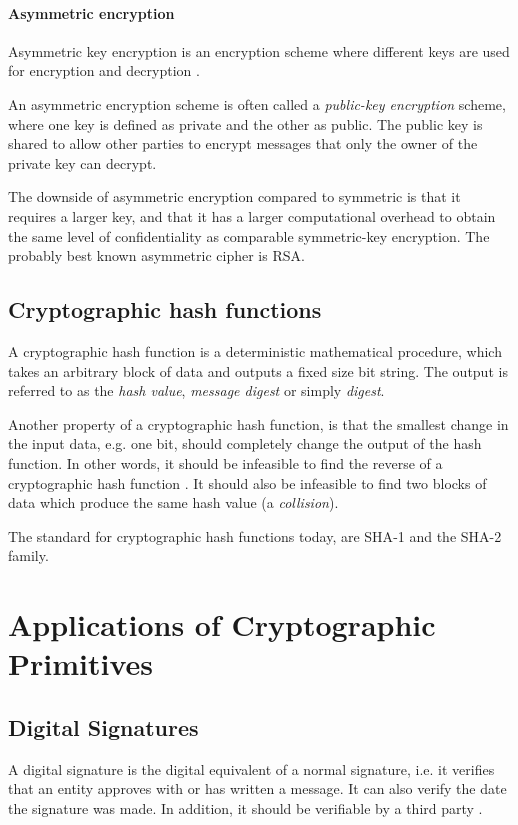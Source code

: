 \documentclass[pdftex,english,10pt,b5paper,twoside]{book}
\begin{document}
\paragraph{Asymmetric encryption} Asymmetric key encryption is an encryption scheme
where different keys are used for encryption and decryption 
\cite[p. 259]{stallings}. 

An asymmetric encryption scheme is often called a \emph{public-key
encryption} scheme, where one key is defined as private and the other as public.
The public key is shared to allow other parties to encrypt messages that only the
owner of the private key can decrypt.

The downside of asymmetric encryption compared to symmetric is that it requires
a larger key, and that it has a larger computational overhead to obtain the
same level of confidentiality as comparable symmetric-key encryption. The
probably best known asymmetric cipher is \ac{RSA}.

\subsection{Cryptographic hash functions}

A cryptographic hash function is a deterministic mathematical procedure, which
takes an arbitrary block of data and outputs a fixed size bit string. The
output is referred to as the \emph{hash value}, \emph{message digest} or simply
\emph{digest}.

Another property of a cryptographic hash function, is that the
smallest change in the input data, e.g. one bit, should completely change the
output of the hash function. In other words, it should be infeasible to find the
reverse of a cryptographic hash function \cite[p. 335]{stallings}. It should
also be infeasible to find two blocks of data which produce the same hash value
(a \emph{collision}).

The standard for cryptographic hash functions today, are \ac{SHA}-1 and the
\ac{SHA}-2 family.

\section{Applications of Cryptographic Primitives}

\subsection{Digital Signatures}

A digital signature is the digital equivalent of a normal signature, i.e. it
verifies that an entity approves with or has written a message. It can also
verify the date the signature was made. In addition, it should be verifiable by
a third party \cite[p.  379]{stallings}. 
\end{document}
